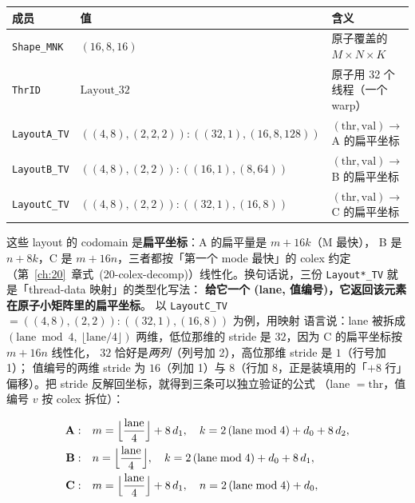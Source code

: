\begin{center}
\footnotesize
\begin{tabular}{@{}lll@{}}
  \toprule
  成员 & 值 & 含义 \\
  \midrule
  \texttt{Shape\_MNK} & $(16,8,16)$ & 原子覆盖的 $M\times N\times K$ \\
  \texttt{ThrID} & $\mathrm{Layout}\_32$ & 原子用 32 个线程（一个 warp） \\
  \texttt{LayoutA\_TV} & $((4,8),(2,2,2)){:}((32,1),(16,8,128))$ & $(\mathrm{thr},\mathrm{val})\to$ A 的扁平坐标 \\
  \texttt{LayoutB\_TV} & $((4,8),(2,2)){:}((16,1),(8,64))$ & $(\mathrm{thr},\mathrm{val})\to$ B 的扁平坐标 \\
  \texttt{LayoutC\_TV} & $((4,8),(2,2)){:}((32,1),(16,8))$ & $(\mathrm{thr},\mathrm{val})\to$ C 的扁平坐标 \\
  \bottomrule
\end{tabular}
\end{center}

这些 layout 的 codomain 是\textbf{扁平坐标}：A 的扁平量是 $m + 16k$（M 最快），
B 是 $n + 8k$，C 是 $m + 16n$，三者都按「第一个 mode 最快」的 colex 约定
（第~\ref{ch:20}~章式~(20-colex-decomp)）线性化。换句话说，三份
\texttt{Layout*\_TV} 就是「thread-data 映射」的类型化写法：
\textbf{给它一个 (lane, 值编号)，它返回该元素在原子小矩阵里的扁平坐标}。
以 \texttt{LayoutC\_TV} $=((4,8),(2,2)){:}((32,1),(16,8))$ 为例，用映射
语言说：lane 被拆成 $(\mathrm{lane}\bmod4,\ \lfloor\mathrm{lane}/4\rfloor)$
两维，低位那维的 stride 是 $32$，因为 C 的扁平坐标按 $m+16n$ 线性化，
$32$ 恰好是\emph{两列}（列号加 2），高位那维 stride 是 $1$（行号加 1）；
值编号的两维 stride 为 $16$（列加 1）与 $8$（行加 8，正是装填用的「$+8$ 行」
偏移）。把 stride 反解回坐标，就得到三条可以独立验证的公式
（lane $=\mathrm{thr}$，值编号 $v$ 按 colex 拆位）：

\begin{align}
  \textbf{A}:\quad &m = \Bigl\lfloor\frac{\mathrm{lane}}{4}\Bigr\rfloor + 8\,d_1,
  \quad k = 2\,(\mathrm{lane}\bmod 4) + d_0 + 8\,d_2, \label{eq:22-atom-a}\\
  \textbf{B}:\quad &n = \Bigl\lfloor\frac{\mathrm{lane}}{4}\Bigr\rfloor,
  \quad k = 2\,(\mathrm{lane}\bmod 4) + d_0 + 8\,d_1, \label{eq:22-atom-b}\\
  \textbf{C}:\quad &m = \Bigl\lfloor\frac{\mathrm{lane}}{4}\Bigr\rfloor + 8\,d_1,
  \quad n = 2\,(\mathrm{lane}\bmod 4) + d_0, \label{eq:22-atom-c}
\end{align}


